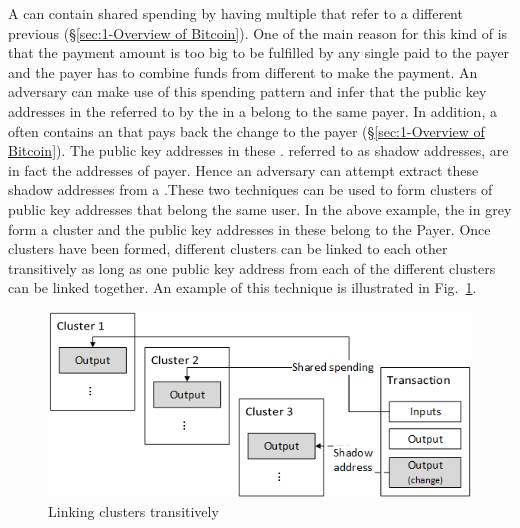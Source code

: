 A \kwTransaction{}{} can contain shared spending by having multiple  that refer to a different previous  (\S\ref{sec:1-Overview of Bitcoin}). One of the main reason for this kind of \kwTransaction{}{} is that the payment amount is too big to be fulfilled by any single \kwOutput{} paid to the payer and the payer has to combine funds from different  to make the payment. An adversary can make use of this spending pattern and infer that the public key addresses in the  referred to by the  in a \kwTransaction{}{} belong to the same payer. In addition, a \kwTransaction{}{} often contains an \kwOutput{} that pays back the change to the payer (\S\ref{sec:1-Overview of Bitcoin}). The public key addresses in these . referred to as shadow addresses, are in fact the addresses of payer. Hence an adversary can attempt extract these shadow addresses from a \kwTransaction{}{}.These two techniques can be used to form clusters of public key addresses that belong the same user. In the above example, the  in grey form a cluster and the public key addresses in these  belong to the Payer. Once clusters have been formed, different clusters can be linked to each other transitively as long as one public key address from each of the different clusters can be linked together. An example of this technique is illustrated in Fig.~\ref{fig:bitcoin_cluster_transitive}.

\begin{figure}[H]
	\begin{center}
		\includegraphics[scale=0.95]{bitcoin-cluster-transitive} 
		\caption{Linking clusters transitively}
		\label{fig:bitcoin_cluster_transitive} 
	\end{center}
\end{figure}

